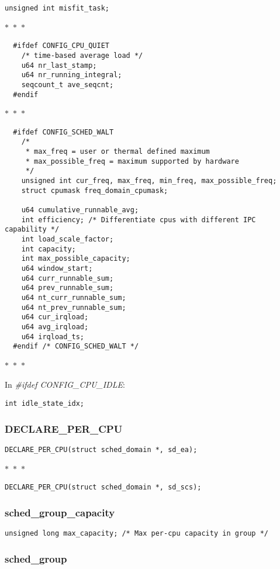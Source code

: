 \documentclass{article}
\newcommand{\divider}{{\begin{center}
  $\ast$~$\ast$~$\ast$
\end{center}}}
\begin{document}
\begin{verbatim}
unsigned int misfit_task;
\end{verbatim}
\divider
\begin{verbatim}
  #ifdef CONFIG_CPU_QUIET
    /* time-based average load */
    u64 nr_last_stamp;
    u64 nr_running_integral;
    seqcount_t ave_seqcnt;
  #endif
\end{verbatim}
\divider
\begin{verbatim}
  #ifdef CONFIG_SCHED_WALT
    /*
     * max_freq = user or thermal defined maximum
     * max_possible_freq = maximum supported by hardware
     */
    unsigned int cur_freq, max_freq, min_freq, max_possible_freq;
    struct cpumask freq_domain_cpumask;

    u64 cumulative_runnable_avg;
    int efficiency; /* Differentiate cpus with different IPC capability */
    int load_scale_factor;
    int capacity;
    int max_possible_capacity;
    u64 window_start;
    u64 curr_runnable_sum;
    u64 prev_runnable_sum;
    u64 nt_curr_runnable_sum;
    u64 nt_prev_runnable_sum;
    u64 cur_irqload;
    u64 avg_irqload;
    u64 irqload_ts;
  #endif /* CONFIG_SCHED_WALT */
\end{verbatim}
\divider
In \textit{\#ifdef CONFIG\_CPU\_IDLE}:
\begin{verbatim}
int idle_state_idx;
\end{verbatim}

\subsubsection{DECLARE\_PER\_CPU}

\begin{verbatim}
DECLARE_PER_CPU(struct sched_domain *, sd_ea);
\end{verbatim}
\divider
\begin{verbatim}
DECLARE_PER_CPU(struct sched_domain *, sd_scs);
\end{verbatim}

\subsubsection{sched\_group\_capacity}

\begin{verbatim}
unsigned long max_capacity; /* Max per-cpu capacity in group */
\end{verbatim}

\subsubsection{sched\_group}
\end{document}

